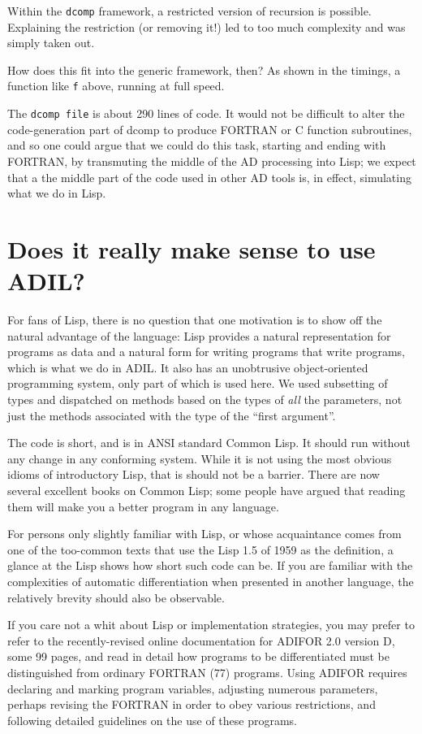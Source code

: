 \documentclass{article}
\begin{document}
{{{Within the {\tt dcomp} framework, a restricted version of recursion is
possible. Explaining the restriction (or removing it!) led to too much
complexity and was simply taken out.

How does this fit into the generic framework, then? As shown in the timings,
a function like {\tt f} above, running at full speed.

The {\tt dcomp file} is about 290 lines of code. It would not be difficult
to alter the code-generation part of dcomp to produce FORTRAN or C function
subroutines, and so one could argue that we could
do this task, starting and ending with FORTRAN, 
by transmuting the middle of the AD processing into Lisp; we expect that a
the middle part of the code used in other AD tools is, in effect, simulating
what we do in Lisp.

\section{Does it really make sense to use ADIL?}

For fans of Lisp, there is no question that one motivation is to show
off the natural advantage of the language: Lisp provides a natural
representation for programs as data and a natural form for writing
programs that write programs, which is what we do in ADIL. It also has
an unobtrusive object-oriented programming system, only part of which
is used here. We used subsetting of types and dispatched on methods
based on the types of {\em all} the parameters, not just the methods
associated with the type of the ``first argument''.

The code is short, and is in ANSI standard Common Lisp. It should run
without any change in any conforming system. While it is not using the
most obvious idioms of introductory Lisp, that is should not be a
barrier. There are now several excellent books on Common Lisp; some
people have argued that reading them will make you a better program in
any language.

For persons only slightly familiar with Lisp, or whose acquaintance
comes from one of the too-common texts that use the Lisp 1.5 of
1959 as the definition, a glance at the Lisp shows how short
such code can be.  If you are familiar with the complexities of
automatic differentiation when presented in another language,
the relatively brevity should also be observable.

If you care not a whit about Lisp or implementation strategies, you
may prefer to refer to the recently-revised online documentation for ADIFOR
2.0 version D, some 99 pages, and read in detail how programs to be
differentiated must be distinguished from ordinary FORTRAN (77)
programs.  Using ADIFOR requires declaring and marking program
variables, adjusting numerous parameters, perhaps revising the FORTRAN
in order to obey various restrictions, and following detailed
guidelines on the use of these programs.

}}}
\end{document}
